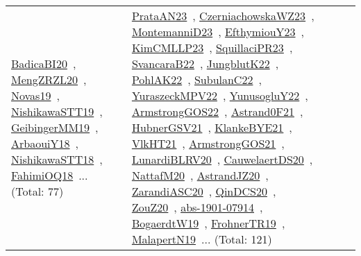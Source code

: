 {\begin{longtable}{lp{3cm}>{\raggedright\arraybackslash}p{6cm}>{\raggedright\arraybackslash}p{6cm}>{\raggedright\arraybackslash}p{8cm}}
\href{works/BadicaBI20.pdf}{BadicaBI20}~\cite{BadicaBI20}, \href{works/MengZRZL20.pdf}{MengZRZL20}~\cite{MengZRZL20}, \href{works/Novas19.pdf}{Novas19}~\cite{Novas19}, \href{works/NishikawaSTT19.pdf}{NishikawaSTT19}~\cite{NishikawaSTT19}, \href{works/GeibingerMM19.pdf}{GeibingerMM19}~\cite{GeibingerMM19}, \href{works/ArbaouiY18.pdf}{ArbaouiY18}~\cite{ArbaouiY18}, \href{works/NishikawaSTT18.pdf}{NishikawaSTT18}~\cite{NishikawaSTT18}, \href{works/FahimiOQ18.pdf}{FahimiOQ18}~\cite{FahimiOQ18}... (Total: 77) & \href{works/PrataAN23.pdf}{PrataAN23}~\cite{PrataAN23}, \href{works/CzerniachowskaWZ23.pdf}{CzerniachowskaWZ23}~\cite{CzerniachowskaWZ23}, \href{works/MontemanniD23.pdf}{MontemanniD23}~\cite{MontemanniD23}, \href{works/EfthymiouY23.pdf}{EfthymiouY23}~\cite{EfthymiouY23}, \href{works/KimCMLLP23.pdf}{KimCMLLP23}~\cite{KimCMLLP23}, \href{works/SquillaciPR23.pdf}{SquillaciPR23}~\cite{SquillaciPR23}, \href{works/SvancaraB22.pdf}{SvancaraB22}~\cite{SvancaraB22}, \href{works/JungblutK22.pdf}{JungblutK22}~\cite{JungblutK22}, \href{works/PohlAK22.pdf}{PohlAK22}~\cite{PohlAK22}, \href{works/SubulanC22.pdf}{SubulanC22}~\cite{SubulanC22}, \href{works/YuraszeckMPV22.pdf}{YuraszeckMPV22}~\cite{YuraszeckMPV22}, \href{works/YunusogluY22.pdf}{YunusogluY22}~\cite{YunusogluY22}, \href{works/ArmstrongGOS22.pdf}{ArmstrongGOS22}~\cite{ArmstrongGOS22}, \href{works/Astrand0F21.pdf}{Astrand0F21}~\cite{Astrand0F21}, \href{works/HubnerGSV21.pdf}{HubnerGSV21}~\cite{HubnerGSV21}, \href{works/KlankeBYE21.pdf}{KlankeBYE21}~\cite{KlankeBYE21}, \href{works/VlkHT21.pdf}{VlkHT21}~\cite{VlkHT21}, \href{works/ArmstrongGOS21.pdf}{ArmstrongGOS21}~\cite{ArmstrongGOS21}, \href{works/LunardiBLRV20.pdf}{LunardiBLRV20}~\cite{LunardiBLRV20}, \href{works/CauwelaertDS20.pdf}{CauwelaertDS20}~\cite{CauwelaertDS20}, \href{works/NattafM20.pdf}{NattafM20}~\cite{NattafM20}, \href{works/AstrandJZ20.pdf}{AstrandJZ20}~\cite{AstrandJZ20}, \href{works/ZarandiASC20.pdf}{ZarandiASC20}~\cite{ZarandiASC20}, \href{works/QinDCS20.pdf}{QinDCS20}~\cite{QinDCS20}, \href{works/ZouZ20.pdf}{ZouZ20}~\cite{ZouZ20}, \href{works/abs-1901-07914.pdf}{abs-1901-07914}~\cite{abs-1901-07914}, \href{works/BogaerdtW19.pdf}{BogaerdtW19}~\cite{BogaerdtW19}, \href{works/FrohnerTR19.pdf}{FrohnerTR19}~\cite{FrohnerTR19}, \href{works/MalapertN19.pdf}{MalapertN19}~\cite{MalapertN19}... (Total: 121)\\

\end{longtable}}
